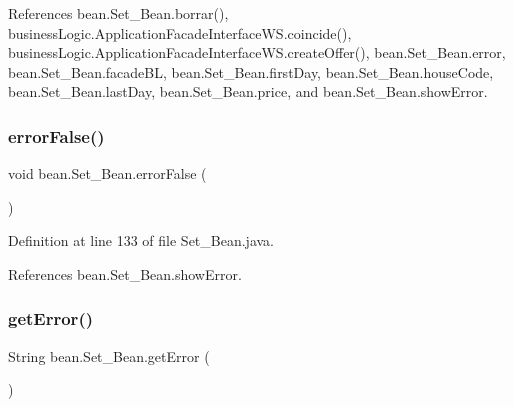 References bean.\+Set\+\_\+\+Bean.\+borrar(), business\+Logic.\+Application\+Facade\+Interface\+W\+S.\+coincide(), business\+Logic.\+Application\+Facade\+Interface\+W\+S.\+create\+Offer(), bean.\+Set\+\_\+\+Bean.\+error, bean.\+Set\+\_\+\+Bean.\+facade\+BL, bean.\+Set\+\_\+\+Bean.\+first\+Day, bean.\+Set\+\_\+\+Bean.\+house\+Code, bean.\+Set\+\_\+\+Bean.\+last\+Day, bean.\+Set\+\_\+\+Bean.\+price, and bean.\+Set\+\_\+\+Bean.\+show\+Error.

\mbox{\label{classbean_1_1Set__Bean_a627ff4ed667dd2be57ea46f8c196cda7}} 
\subsubsection{\texorpdfstring{errorFalse()}{errorFalse()}}
{\footnotesize\ttfamily void bean.\+Set\+\_\+\+Bean.\+error\+False (\begin{DoxyParamCaption}{ }\end{DoxyParamCaption})}



Definition at line 133 of file Set\+\_\+\+Bean.\+java.


\begin{DoxyCode}{0}

\end{DoxyCode}


References bean.\+Set\+\_\+\+Bean.\+show\+Error.

\mbox{\label{classbean_1_1Set__Bean_ab9e88a7d0e094271ff7f9fb337f66c11}} 
\subsubsection{\texorpdfstring{getError()}{getError()}}
{\footnotesize\ttfamily String bean.\+Set\+\_\+\+Bean.\+get\+Error (\begin{DoxyParamCaption}{ }\end{DoxyParamCaption})}



